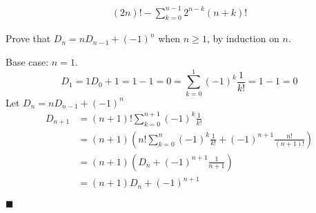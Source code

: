 \documentclass[12pt]{article}
\renewcommand{\qed}{\hfill$\blacksquare$}
\renewenvironment{proof}{\vspace{1em}\begin{addmargin}[2em]{0em}\begin{newproof}}{\end{newproof}\end{addmargin}\qed}
\newenvironment{exercise}[2][Exercise]{\begin{trivlist}
\item[\hskip \labelsep {\bfseries #1} \hskip \labelsep {\bfseries #2.}]}{\end{trivlist}}
\begin{document}
\begin{align*}
	(2n)! - \sum_{k=0}^{n-1} 2^{n-k}(n+k)!
\end{align*}
\begin{exercise}{2.2.1 (1pt)}
	Prove that $D_n = nD_{n-1} + (-1)^n$ when $n \ge 1$, by induction on $n$.
\end{exercise}
\begin{proof}
	Base case: $n = 1$. 
	\[
		D_1 = 1D_0 + 1 = 1 - 1 = 0 = \sum_{k=0}^1 (-1)^k \frac{1}{k!} = 1 - 1 = 0
	\]
	Let $D_n = nD_{n-1} + (-1)^n$
	\begin{align*}
		D_{n+1} &= (n+1)!\sum_{k=0}^{n+1}(-1)^k \frac{1}{k!} \\
			&= (n+1)\left(n!\sum_{k=0}^n (-1)^k \frac{1}{k!} + (-1)^{n+1}\frac{n!}{(n+1)!}\right) \\
			&= (n+1)(D_n + (-1)^{n+1}\frac{1}{n+1}) \\
			&= (n+1)D_n + (-1)^{n+1}
	\end{align*}
\end{proof}
\end{document}
